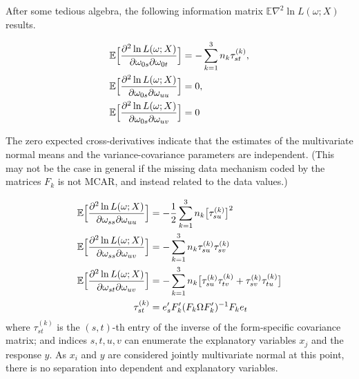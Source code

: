 \documentclass[11pt]{asaproc}
\newcommand{\Expect}{\mathbb{E}}
\begin{document}
After some tedious algebra,
the following information matrix $\Expect \nabla^2 \ln L(\omega;X)$ results.



\begin{align}
    \Expect \Bigl[ \frac {\partial^2 \ln L(\omega;X)}{\partial \omega_{0s}\partial \omega_{0t}} \Bigr]
    & =
    - \sum_{k=1}^3 n_k \tau^{(k)}_{st},
    \label{eq:d2lnl:domega0:domega0}
    \\
    \Expect \Bigl[ \frac {\partial^2 \ln L(\omega;X)}{\partial \omega_{0s}\partial \omega_{uu}} \Bigr]
    & = 0,
    \label{eq:d2lnl:domega0:domega:uu}
    \\
    \Expect \Bigl[ \frac {\partial^2 \ln L(\omega;X)}{\partial \omega_{0s}\partial \omega_{uv}} \Bigr]
    & = 0
    \label{eq:d2lnl:domega0:domega:uv}
\end{align}

The zero expected cross-derivatives indicate that the estimates of the multivariate
normal means and the variance-covariance parameters are independent. (This may not be the case in general
if the missing data mechanism coded by the matrices $F_k$ is not MCAR, and instead related to the data values.)

\begin{align}
    \Expect \Bigl[ \frac {\partial^2 \ln L(\omega;X)}{\partial \omega_{ss}\partial \omega_{uu}} \Bigr]
        & = - \frac12 \sum_{k=1}^3 n_k \bigr[ \tau^{(k)}_{su} \bigl]^2
    \label{eq:d2lnl:domega:ss:domega:uu}
    \\
    \Expect \Bigl[ \frac {\partial^2 \ln L(\omega;X)}{\partial \omega_{ss}\partial \omega_{uv}} \Bigr]
    & = - \sum_{k=1}^3 n_k \tau^{(k)}_{su} \tau^{(k)}_{sv}
    \label{eq:d2lnl:domega:ss:domega:uv}
    \\
    \Expect \Bigl[ \frac {\partial^2 \ln L(\omega;X)}{\partial \omega_{st}\partial \omega_{uv}} \Bigr]
    & = - \sum_{k=1}^3 n_k \bigl[ \tau^{(k)}_{su} \tau^{(k)}_{tv} + \tau^{(k)}_{sv} \tau^{(k)}_{tu} \bigr]
    \label{eq:d2lnl:domega:st:domega:uv}
    \\
    \tau^{(k)}_{st} & = e_s' F_k' (F_k \Omega F_k')^{-1} F_k e_t
    \label{eq:tau:kst}
\end{align}
where
$\tau^{(k)}_{st}$ is the $(s,t)$-th entry of the inverse of the form-specific covariance matrix;
and indices $s,t,u,v$ can enumerate the explanatory variables $x_j$ and the response $y$.
As $x_i$ and $y$ are considered jointly multivariate normal at this point, there is no separation into
dependent and explanatory variables.
\end{document}
